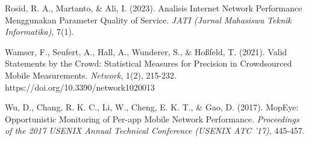 \documentclass[11pt,a4paper]{article}
\begin{document}
\begin{list}{}{\leftmargin=1cm \itemindent=-1cm \itemsep=4pt}
\item Rosid, R. A., Martanto, \& Ali, I. (2023). Analisis Internet Network Performance Menggunakan Parameter Quality of Service. \textit{JATI (Jurnal Mahasiswa Teknik Informatika)}, 7(1).
\item Wamser, F., Seufert, A., Hall, A., Wunderer, S., \& Hoßfeld, T. (2021). Valid Statements by the Crowd: Statistical Measures for Precision in Crowdsourced Mobile Measurements. \textit{Network}, 1(2), 215-232. https://doi.org/10.3390/network1020013
\item Wu, D., Chang, R. K. C., Li, W., Cheng, E. K. T., \& Gao, D. (2017). MopEye: Opportunistic Monitoring of Per-app Mobile Network Performance. \textit{Proceedings of the 2017 USENIX Annual Technical Conference (USENIX ATC '17)}, 445-457.
\end{list}
\end{document}
